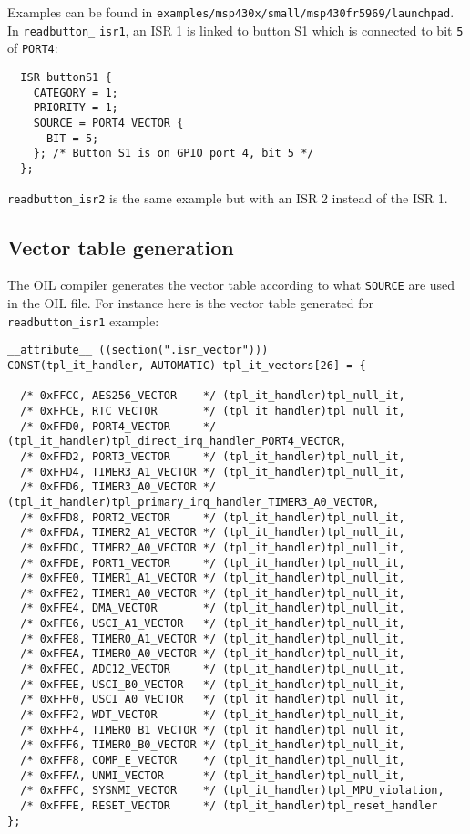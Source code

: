 \documentclass[11pt, oneside]{article}   	%
\begin{document}
Examples can be found in \lstinline[breaklines=true]{examples/msp430x/small/msp430fr5969/launchpad}. In \lstinline{readbutton_} \lstinline{isr1}, an ISR 1 is linked to button S1 which is connected to bit \lstinline{5} of \lstinline{PORT4}:

\begin{lstlisting}
  ISR buttonS1 {
    CATEGORY = 1;
    PRIORITY = 1;
    SOURCE = PORT4_VECTOR {
      BIT = 5;
    }; /* Button S1 is on GPIO port 4, bit 5 */
  };
\end{lstlisting}

\lstinline{readbutton_isr2} is the same example but with an ISR 2 instead of the ISR 1.

\subsection{Vector table generation}

The OIL compiler generates the vector table according to what \lstinline{SOURCE} are used in the OIL file. For instance here is the vector table generated for \lstinline[breaklines=true]{readbutton_isr1} example:


\begin{lstlisting}[basicstyle=\fontsize{7.5}{9}\selectfont\ttfamily]
__attribute__ ((section(".isr_vector")))
CONST(tpl_it_handler, AUTOMATIC) tpl_it_vectors[26] = {

  /* 0xFFCC, AES256_VECTOR    */ (tpl_it_handler)tpl_null_it,
  /* 0xFFCE, RTC_VECTOR       */ (tpl_it_handler)tpl_null_it,
  /* 0xFFD0, PORT4_VECTOR     */ (tpl_it_handler)tpl_direct_irq_handler_PORT4_VECTOR,
  /* 0xFFD2, PORT3_VECTOR     */ (tpl_it_handler)tpl_null_it,
  /* 0xFFD4, TIMER3_A1_VECTOR */ (tpl_it_handler)tpl_null_it,
  /* 0xFFD6, TIMER3_A0_VECTOR */ (tpl_it_handler)tpl_primary_irq_handler_TIMER3_A0_VECTOR,
  /* 0xFFD8, PORT2_VECTOR     */ (tpl_it_handler)tpl_null_it,
  /* 0xFFDA, TIMER2_A1_VECTOR */ (tpl_it_handler)tpl_null_it,
  /* 0xFFDC, TIMER2_A0_VECTOR */ (tpl_it_handler)tpl_null_it,
  /* 0xFFDE, PORT1_VECTOR     */ (tpl_it_handler)tpl_null_it,
  /* 0xFFE0, TIMER1_A1_VECTOR */ (tpl_it_handler)tpl_null_it,
  /* 0xFFE2, TIMER1_A0_VECTOR */ (tpl_it_handler)tpl_null_it,
  /* 0xFFE4, DMA_VECTOR       */ (tpl_it_handler)tpl_null_it,
  /* 0xFFE6, USCI_A1_VECTOR   */ (tpl_it_handler)tpl_null_it,
  /* 0xFFE8, TIMER0_A1_VECTOR */ (tpl_it_handler)tpl_null_it,
  /* 0xFFEA, TIMER0_A0_VECTOR */ (tpl_it_handler)tpl_null_it,
  /* 0xFFEC, ADC12_VECTOR     */ (tpl_it_handler)tpl_null_it,
  /* 0xFFEE, USCI_B0_VECTOR   */ (tpl_it_handler)tpl_null_it,
  /* 0xFFF0, USCI_A0_VECTOR   */ (tpl_it_handler)tpl_null_it,
  /* 0xFFF2, WDT_VECTOR       */ (tpl_it_handler)tpl_null_it,
  /* 0xFFF4, TIMER0_B1_VECTOR */ (tpl_it_handler)tpl_null_it,
  /* 0xFFF6, TIMER0_B0_VECTOR */ (tpl_it_handler)tpl_null_it,
  /* 0xFFF8, COMP_E_VECTOR    */ (tpl_it_handler)tpl_null_it,
  /* 0xFFFA, UNMI_VECTOR      */ (tpl_it_handler)tpl_null_it,
  /* 0xFFFC, SYSNMI_VECTOR    */ (tpl_it_handler)tpl_MPU_violation,
  /* 0xFFFE, RESET_VECTOR     */ (tpl_it_handler)tpl_reset_handler
};
\end{lstlisting}
\end{document}

